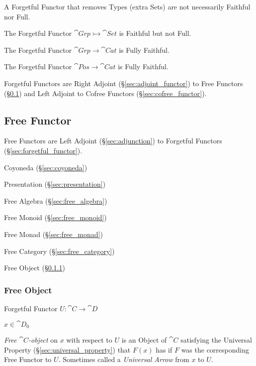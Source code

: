 A Forgetful Functor that removes Types (extra Sets) are not
necessarily Faithful nor Full.

The Forgetful Functor $\cat{Grp} \rightarrowtail \cat{Set}$ is
Faithful but not Full.

The Forgetful Functor $\cat{Grp} \rightarrow \cat{Cat}$ is
Fully Faithful.

The Forgetful Functor $\cat{Pos} \rightarrow \cat{Cat}$ is
Fully Faithful.

Forgetful Functors are Right Adjoint (\S\ref{sec:adjoint_functor}) to
Free Functors (\S\ref{sec:free_functor}) and Left Adjoint to Cofree
Functors (\S\ref{sec:cofree_functor}).



\subsection{Free Functor}\label{sec:free_functor}

Free Functors are Left Adjoint (\S\ref{sec:adjunction}) to Forgetful
Functors (\S\ref{sec:forgetful_functor}).

Coyoneda (\S\ref{sec:coyoneda})

Presentation (\S\ref{sec:presentation})

Free Algebra (\S\ref{sec:free_algebra})

Free Monoid (\S\ref{sec:free_monoid})

Free Monad (\S\ref{sec:free_monad})

Free Category (\S\ref{sec:free_category})

Free Object (\S\ref{sec:free_object})



\subsubsection{Free Object}\label{sec:free_object}

Forgetful Functor $U : \cat{C} \rightarrow \cat{D}$

$x \in \cat{D}_0$

\emph{Free $\cat{C}$-object} on $x$ with respect to $U$ is an Object
of $\cat{C}$ satisfying the Universal Property
(\S\ref{sec:universal_property}) that $F(x)$ has if $F$ was the
corresponding Free Functor to $U$. Sometimes called a \emph{Universal
  Arrow} from $x$ to $U$.

